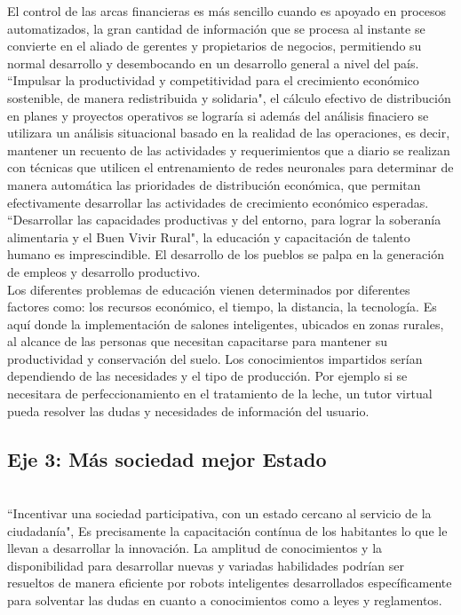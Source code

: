 \documentclass[preprint,12pt,3p]{elsarticle}
\begin{document}
El control de las arcas financieras es más sencillo cuando es apoyado en procesos automatizados, la gran cantidad de información que se procesa al instante se convierte en el aliado de gerentes y propietarios de negocios, permitiendo su normal desarrollo y desembocando en un desarrollo general a nivel del país.\\

``Impulsar la productividad y competitividad para el crecimiento económico sostenible, de manera redistribuida y solidaria", el cálculo efectivo de distribución en planes y proyectos operativos se lograría si además del análisis finaciero se utilizara un análisis situacional basado en la realidad de las operaciones, es decir, mantener un recuento de las actividades y requerimientos que a diario se realizan con técnicas que utilicen el entrenamiento de redes neuronales para determinar de manera automática las prioridades de distribución económica, que permitan efectivamente desarrollar las actividades de crecimiento económico esperadas.\\

``Desarrollar las capacidades productivas y del entorno, para lograr la soberanía alimentaria y el Buen Vivir Rural", la educación y capacitación de talento humano es imprescindible. El desarrollo de los pueblos se palpa en la generación de empleos y desarrollo productivo. \\

Los diferentes problemas de educación vienen determinados por diferentes factores como: los recursos económico, el tiempo, la distancia, la tecnología. Es aquí donde la implementación de salones inteligentes, ubicados en zonas rurales, al alcance de las personas que necesitan capacitarse para mantener su productividad y conservación del suelo. Los conocimientos impartidos serían dependiendo de las necesidades y el tipo de producción. Por ejemplo si se necesitara de perfeccionamiento en el tratamiento de la leche, un tutor virtual pueda resolver las dudas y necesidades de información del usuario.\\

\subsection{Eje 3: Más sociedad mejor Estado}
\label{subsec1}\\
``Incentivar una sociedad participativa, con un estado cercano al servicio de la ciudadanía", Es precisamente la capacitación contínua de los habitantes lo que le llevan a desarrollar la innovación. La amplitud de conocimientos y la disponibilidad para desarrollar nuevas y variadas habilidades podrían ser resueltos de manera eficiente por robots inteligentes desarrollados específicamente para solventar las dudas en cuanto a conocimientos como a leyes y reglamentos. \\
\end{document}
